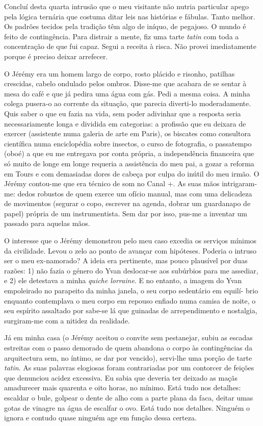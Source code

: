 Concluí desta quarta intrusão que o meu visitante não nutria particular
apego pela lógica ternária que costuma ditar leis nas histórias e
fábulas. Tanto melhor. Os padrões tecidos pela tradição têm algo de
iníquo, de pegajoso. O mundo é feito de contingência. Para distrair a
mente, fiz uma tarte \emph{tatin }com toda a concentração de que fui
capaz. Segui a receita à risca. Não provei imediatamente porque é
preciso deixar arrefecer.

O Jérémy era um homem largo de corpo, rosto plácido e risonho, patilhas
crescidas, cabelo ondulado pelos ombros. Disse-me que acabara de se
sentar à mesa do café e que já pedira uma água com gás. Pedi a mesma
coisa. A minha colega pusera-o ao corrente da situação, que parecia
diverti-lo moderadamente. Quis saber o que eu fazia na vida, sem poder
adivinhar que a resposta seria necessariamente longa e dividida em
categorias: a profissão que eu deixara de exercer (assistente numa
galeria de arte em Paris), os biscates como consultora científica numa
enciclopédia sobre insectos, o curso de fotografia, o passatempo
(oboé) a que eu me entregava por conta própria, a independência
financeira que só muito de longe em longe requeria a assistência do meu
pai, a gozar a reforma em Tours e com demasiadas dores de cabeça por
culpa do inútil
do meu irmão. O Jérémy contou-me que era técnico de som no Canal +. As
suas mãos intrigaram-me: dedos robustos de quem exerce um ofício manual,
mas com uma delicadeza de movimentos (segurar o copo, escrever na
agenda, dobrar um guardanapo de papel) própria de um instrumentista. Sem
dar por isso, pus-me a inventar um passado para aquelas mãos.

O interesse que o Jérémy demonstrou pelo meu caso excedia os serviços
mínimos da civilidade. Levou o zelo ao ponto de avançar com hipóteses.
Poderia o intruso ser o meu ex-namorado? A ideia era pertinente, mas pouco plausível por duas razões:
1) não fazia o género do Yvan deslocar-se aos subúrbios para me
assediar, e 2) ele detestava a minha \emph{quiche lorraine}. E no
entanto, a imagem do Yvan empoleirado no parapeito da minha janela, o
seu corpo sedentário em equilí- brio enquanto contemplava o meu corpo em
repouso enfiado numa camisa de noite, o seu espírito assaltado por
sabe-se lá que guinadas de arrependimento e nostalgia, surgiram-me com a
nitidez da realidade.

Já em minha casa (o Jérémy aceitou o convite sem pestanejar, subiu as
escadas estreitas com o passo demorado de quem abandona o corpo às
contingências da arquitectura sem, no íntimo, se dar por vencido),
servi-lhe uma porção de tarte \emph{tatin}. As suas palavras elogiosas
foram contrariadas por um contorcer de feições que denunciou acidez
excessiva. Eu sabia que deveria ter deixado as maçãs amadurecer mais
quarenta e oito horas, no mínimo. Está tudo nos detalhes: escaldar o
bule, golpear o dente de alho com a parte plana da faca, deitar umas
gotas de vinagre na água de escalfar o ovo. Está tudo nos detalhes.
Ninguém o ignora e contudo quase ninguém age em função dessa certeza.

